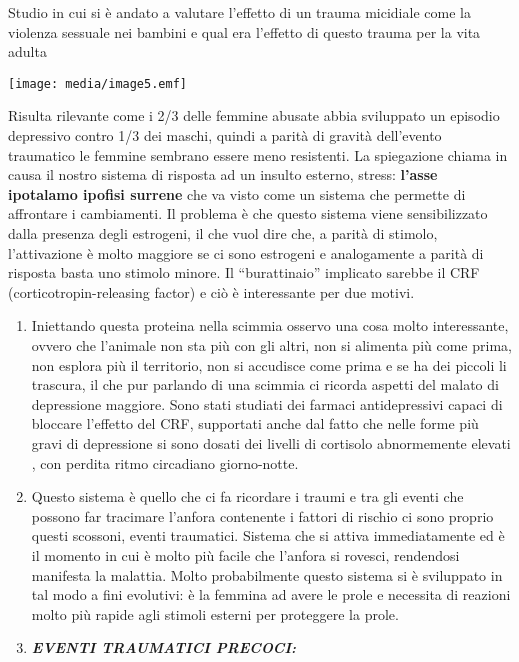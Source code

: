\documentclass[]{article}
\begin{document}
Studio in cui si è andato a valutare l'effetto di un trauma micidiale
come la violenza sessuale nei bambini e qual era l'effetto di questo
trauma per la vita adulta

\texttt{[image: media/image5.emf]}

Risulta rilevante come i 2/3 delle femmine abusate abbia sviluppato un
episodio depressivo contro 1/3 dei maschi, quindi a parità di gravità
dell'evento traumatico le femmine sembrano essere meno resistenti. La
spiegazione chiama in causa il nostro sistema di risposta ad un insulto
esterno, stress: \textbf{l'asse ipotalamo ipofisi surrene} che va visto
come un sistema che permette di affrontare i cambiamenti. Il problema è
che questo sistema viene sensibilizzato dalla presenza degli estrogeni,
il che vuol dire che, a parità di stimolo, l'attivazione è molto
maggiore se ci sono estrogeni e analogamente a parità di risposta basta
uno stimolo minore. Il ``burattinaio'' implicato sarebbe il CRF
(corticotropin-releasing factor) e ciò è interessante per due motivi.

\begin{enumerate}
\def\labelenumi{\arabic{enumi}.}
\item
  Iniettando questa proteina nella scimmia osservo una cosa molto
  interessante, ovvero che l'animale non sta più con gli altri, non si
  alimenta più come prima, non esplora più il territorio, non si
  accudisce come prima e se ha dei piccoli li trascura, il che pur
  parlando di una scimmia ci ricorda aspetti del malato di depressione
  maggiore. Sono stati studiati dei farmaci antidepressivi capaci di
  bloccare l'effetto del CRF, supportati anche dal fatto che nelle forme
  più gravi di depressione si sono dosati dei livelli di cortisolo
  abnormemente elevati , con perdita ritmo circadiano giorno-notte.
\item
  Questo sistema è quello che ci fa ricordare i traumi e tra gli eventi
  che possono far tracimare l'anfora contenente i fattori di rischio ci
  sono proprio questi scossoni, eventi traumatici. Sistema che si attiva
  immediatamente ed è il momento in cui è molto più facile che l'anfora
  si rovesci, rendendosi manifesta la malattia. Molto probabilmente
  questo sistema si è sviluppato in tal modo a fini evolutivi: è la
  femmina ad avere le prole e necessita di reazioni molto più rapide
  agli stimoli esterni per proteggere la prole.
\item
  \textbf{\emph{EVENTI TRAUMATICI PRECOCI:}}
\end{enumerate}
\end{document}

